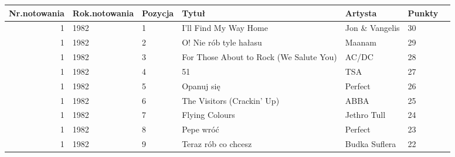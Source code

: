 \documentclass[11pt]{article}
\begin{document}
    
    \begin{tabular}{r|llllll}
 Nr.notowania & Rok.notowania & Pozycja & Tytuł & Artysta & Punkty\\
\hline
	 1                                       & 1982                                    &  1                                      & I'll Find My Way Home                   & Jon \& Vangelis                        & 30                                     \\
	 1                                       & 1982                                    &  2                                      & O! Nie rób tyle hałasu                  & Maanam                                  & 29                                     \\
	 1                                       & 1982                                    &  3                                      & For Those About to Rock (We Salute You) & AC/DC                                   & 28                                     \\
	 1                                       & 1982                                    &  4                                      & 51                                      & TSA                                     & 27                                     \\
	 1                                       & 1982                                    &  5                                      & Opanuj się                              & Perfect                                 & 26                                     \\
	 1                                       & 1982                                    &  6                                      & The Visitors (Crackin' Up)              & ABBA                                    & 25                                     \\
	 1                                       & 1982                                    &  7                                      & Flying Colours                          & Jethro Tull                             & 24                                     \\
	 1                                       & 1982                                    &  8                                      & Pepe wróć                               & Perfect                                 & 23                                     \\
	 1                                       & 1982                                    &  9                                      & Teraz rób co chcesz                     & Budka Suflera                           & 22                                     \\

\end{tabular}
\end{document}
